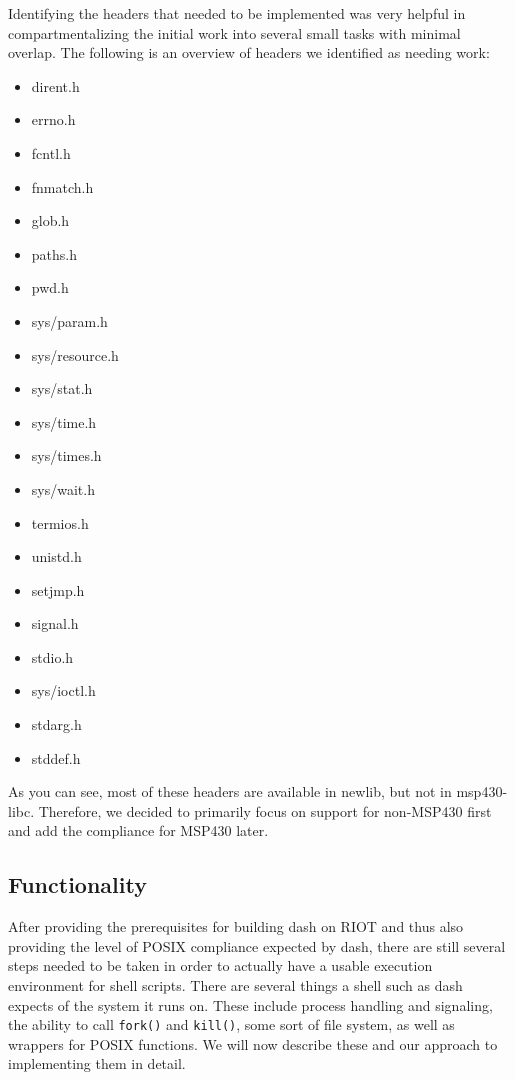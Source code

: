 \documentclass[conference]{IEEEtran}
\begin{document}
Identifying the headers that needed to be implemented was very helpful
in compartmentalizing the initial work into several small tasks with
minimal overlap. The following is an overview of headers we identified
as needing work:

\begin{itemize}
    \item dirent.h\footnotemark[1]
    \item errno.h\footnotemark[1]
    \item fcntl.h\footnotemark[1]
    \item fnmatch.h\footnotemark[1]
    \item glob.h\footnotemark[1]
    \item paths.h\footnotemark[1]
    \item pwd.h\footnotemark[1]
    \item sys/param.h\footnotemark[1]
    \item sys/resource.h\footnotemark[1]
    \item sys/stat.h\footnotemark[1]
    \item sys/time.h\footnotemark[1]
    \item sys/times.h\footnotemark[1]
    \item sys/wait.h\footnotemark[1]
    \item termios.h\footnotemark[1]
    \item unistd.h\footnotemark[1]
    \item setjmp.h\footnotemark[2]
    \item signal.h\footnotemark[2]
    \item stdio.h\footnotemark[3]
    \item sys/ioctl.h\footnotemark[4]
    \item stdarg.h
    \item stddef.h
\end{itemize}


As you can see, most of these headers are available in newlib, but not
in msp430-libc. Therefore, we decided to primarily focus on support for
non-MSP430 first and add the compliance for MSP430 later.

\subsection{Functionality}
\label{sub:Functionality}
After providing the prerequisites for building dash on RIOT and thus
also providing the level of POSIX compliance expected by dash, there are
still several steps needed to be taken in order to actually have
a usable execution environment for shell scripts. There are several
things a shell such as dash expects of the system it runs on. These
include process handling and signaling, the ability to call
\texttt{fork()} and \texttt{kill()}, some sort of file system, as
well as wrappers for POSIX functions. We will now describe these and our
approach to implementing them in detail.
\end{document}
